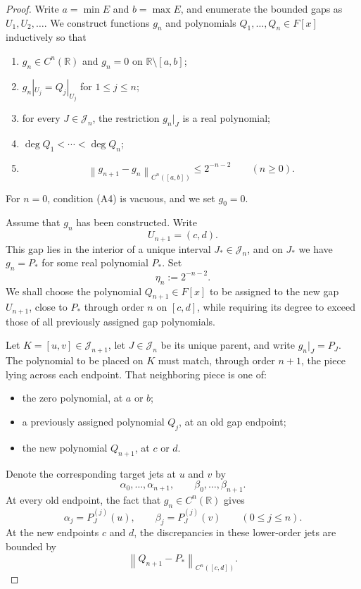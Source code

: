 \documentclass[11pt,reqno]{amsart}
\numberwithin{equation}{section}
\theoremstyle{definition}
\theoremstyle{remark}
\newcommand{\R}{\mathbb R}
\newcommand{\norm}[1]{\left\lVert #1\right\rVert}
\begin{document}
\begin{proof}
Write $a=\min E$ and $b=\max E$, and enumerate the bounded gaps as
$U_1,U_2,\dots$. We construct functions $g_n$ and polynomials
$Q_1,\dots,Q_n\in F[x]$ inductively so that
\begin{enumerate}[label=\textup{(A\arabic*)},leftmargin=3.1em]
\item $g_n\in C^n(\R)$ and $g_n=0$ on $\R\setminus[a,b]$;
\item $g_n|_{U_j}=Q_j|_{U_j}$ for $1\leq j\leq n$;
\item for every $J\in\mathcal J_n$, the restriction $g_n|_J$ is a real polynomial;
\item $\deg Q_1<\cdots<\deg Q_n$;
\item
\begin{equation}\label{eq:increment}
\norm{g_{n+1}-g_n}_{C^n([a,b])}\leq2^{-n-2}
\qquad(n\geq0).
\end{equation}
\end{enumerate}
For $n=0$, condition \textup{(A4)} is vacuous, and we set $g_0=0$.

Assume that $g_n$ has been constructed. Write
\[
U_{n+1}=(c,d).
\]
This gap lies in the interior of a unique interval
$J_*\in\mathcal J_n$, and on $J_*$ we have $g_n=P_*$ for some real
polynomial $P_*$. Set
\[
\eta_n:=2^{-n-2}.
\]
We shall choose the polynomial $Q_{n+1}\in F[x]$ to be assigned to the new gap
$U_{n+1}$, close to $P_*$ through order $n$ on $[c,d]$, while requiring its
degree to exceed those of all previously assigned gap polynomials.

Let $K=[u,v]\in\mathcal J_{n+1}$, let $J\in\mathcal J_n$ be its unique
parent, and write $g_n|_J=P_J$. The polynomial to be placed on $K$ must
match, through order $n+1$, the piece lying across each endpoint. That
neighboring piece is one of:
\begin{itemize}
\item the zero polynomial, at $a$ or $b$;
\item a previously assigned polynomial $Q_j$, at an old gap endpoint;
\item the new polynomial $Q_{n+1}$, at $c$ or $d$.
\end{itemize}
Denote the corresponding target jets at $u$ and $v$ by
\[
\alpha_0,\dots,\alpha_{n+1},
\qquad
\beta_0,\dots,\beta_{n+1}.
\]
At every old endpoint, the fact that $g_n\in C^n(\R)$ gives
\[
\alpha_j=P_J^{(j)}(u),
\qquad
\beta_j=P_J^{(j)}(v)
\qquad(0\leq j\leq n).
\]
At the new endpoints $c$ and $d$, the discrepancies in these lower-order
jets are bounded by
\[
\norm{Q_{n+1}-P_*}_{C^n([c,d])}.
\]


\end{proof}
\end{document}
